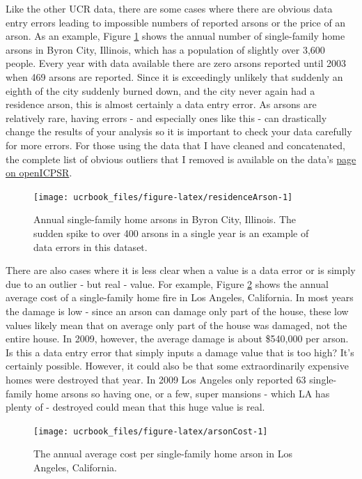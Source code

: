 \documentclass[
  12pt,
  openany]{book}
\begin{document}
Like the other UCR data, there are some cases where there are obvious data entry errors leading to impossible numbers of reported arsons or the price of an arson. As an example, Figure \ref{fig:residenceArson} shows the annual number of single-family home arsons in Byron City, Illinois, which has a population of slightly over 3,600 people. Every year with data available there are zero arsons reported until 2003 when 469 arsons are reported. Since it is exceedingly unlikely that suddenly an eighth of the city suddenly burned down, and the city never again had a residence arson, this is almost certainly a data entry error. As arsons are relatively rare, having errors - and especially ones like this - can drastically change the results of your analysis so it is important to check your data carefully for more errors. For those using the data that I have cleaned and concatenated, the complete list of obvious outliers that I removed is available on the data's \href{https://www.openicpsr.org/openicpsr/project/103540/version/V9/view}{page on openICPSR}.

\begin{figure}

{\centering \texttt{[image: ucrbook\_files/figure-latex/residenceArson-1]} 

}

\caption{Annual single-family home arsons in Byron  City, Illinois. The sudden spike to over 400 arsons in a single year is an example of data errors in this dataset. }\label{fig:residenceArson}
\end{figure}

There are also cases where it is less clear when a value is a data error or is simply due to an outlier - but real - value. For example, Figure \ref{fig:arsonCost} shows the annual average cost of a single-family home fire in Los Angeles, California. In most years the damage is low - since an arson can damage only part of the house, these low values likely mean that on average only part of the house was damaged, not the entire house. In 2009, however, the average damage is about \$540,000 per arson. Is this a data entry error that simply inputs a damage value that is too high? It's certainly possible. However, it could also be that some extraordinarily expensive homes were destroyed that year. In 2009 Los Angeles only reported 63 single-family home arsons so having one, or a few, super mansions - which LA has plenty of - destroyed could mean that this huge value is real.

\begin{figure}

{\centering \texttt{[image: ucrbook\_files/figure-latex/arsonCost-1]} 

}

\caption{The annual average cost per single-family home arson in Los Angeles, California.}\label{fig:arsonCost}
\end{figure}
\end{document}
